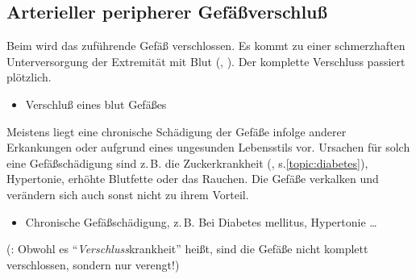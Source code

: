 \subsection{Arterieller peripherer Gefäßverschluß}
\label{topic:arterieller-gefaessverschluss}

{%
Beim  wird das
zuführende Gefäß verschlossen. Es kommt zu einer schmerzhaften 
Unterversorgung der Extremität mit Blut
(,
). Der komplette Verschluss passiert plötzlich. }
{
\begin{itemize}
    \item Verschluß eines blut Gefäßes
\end{itemize}
}{}{}{}

{%
Meistens liegt eine 
chronische Schädigung der
Gefäße infolge anderer Erkankungen oder aufgrund eines
ungesunden Lebensstils vor. Ursachen für solch eine
Gefäßschädigung sind z.\,B. die Zuckerkrankheit (, s.\ref{topic:diabetes}), Hypertonie, erhöhte
Blutfette oder das Rauchen. Die Gefäße verkalken und
verändern sich auch sonst nicht zu ihrem Vorteil.
}
{
\begin{itemize}
  \item Chronische Gefäßschädigung, z.\,B. Bei Diabetes mellitus, Hypertonie \ldots
\end{itemize}
}{}{}{}




 (: Obwohl es
\enquote{\emph{Verschluss}krankheit} heißt, sind die Gefäße nicht komplett
verschlossen, sondern nur verengt!)

\Layout{}{}{}{}{}{}{}


